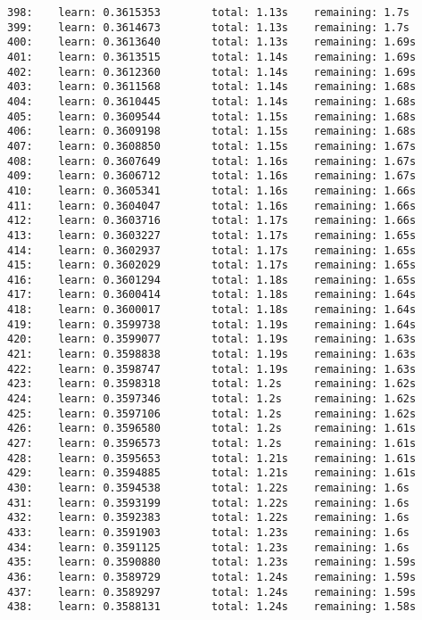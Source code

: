 \documentclass[11pt]{article}
\begin{document}
\begin{Verbatim}[commandchars=\\\{\}]
398:    learn: 0.3615353        total: 1.13s    remaining: 1.7s
399:    learn: 0.3614673        total: 1.13s    remaining: 1.7s
400:    learn: 0.3613640        total: 1.13s    remaining: 1.69s
401:    learn: 0.3613515        total: 1.14s    remaining: 1.69s
402:    learn: 0.3612360        total: 1.14s    remaining: 1.69s
403:    learn: 0.3611568        total: 1.14s    remaining: 1.68s
404:    learn: 0.3610445        total: 1.14s    remaining: 1.68s
405:    learn: 0.3609544        total: 1.15s    remaining: 1.68s
406:    learn: 0.3609198        total: 1.15s    remaining: 1.68s
407:    learn: 0.3608850        total: 1.15s    remaining: 1.67s
408:    learn: 0.3607649        total: 1.16s    remaining: 1.67s
409:    learn: 0.3606712        total: 1.16s    remaining: 1.67s
410:    learn: 0.3605341        total: 1.16s    remaining: 1.66s
411:    learn: 0.3604047        total: 1.16s    remaining: 1.66s
412:    learn: 0.3603716        total: 1.17s    remaining: 1.66s
413:    learn: 0.3603227        total: 1.17s    remaining: 1.65s
414:    learn: 0.3602937        total: 1.17s    remaining: 1.65s
415:    learn: 0.3602029        total: 1.17s    remaining: 1.65s
416:    learn: 0.3601294        total: 1.18s    remaining: 1.65s
417:    learn: 0.3600414        total: 1.18s    remaining: 1.64s
418:    learn: 0.3600017        total: 1.18s    remaining: 1.64s
419:    learn: 0.3599738        total: 1.19s    remaining: 1.64s
420:    learn: 0.3599077        total: 1.19s    remaining: 1.63s
421:    learn: 0.3598838        total: 1.19s    remaining: 1.63s
422:    learn: 0.3598747        total: 1.19s    remaining: 1.63s
423:    learn: 0.3598318        total: 1.2s     remaining: 1.62s
424:    learn: 0.3597346        total: 1.2s     remaining: 1.62s
425:    learn: 0.3597106        total: 1.2s     remaining: 1.62s
426:    learn: 0.3596580        total: 1.2s     remaining: 1.61s
427:    learn: 0.3596573        total: 1.2s     remaining: 1.61s
428:    learn: 0.3595653        total: 1.21s    remaining: 1.61s
429:    learn: 0.3594885        total: 1.21s    remaining: 1.61s
430:    learn: 0.3594538        total: 1.22s    remaining: 1.6s
431:    learn: 0.3593199        total: 1.22s    remaining: 1.6s
432:    learn: 0.3592383        total: 1.22s    remaining: 1.6s
433:    learn: 0.3591903        total: 1.23s    remaining: 1.6s
434:    learn: 0.3591125        total: 1.23s    remaining: 1.6s
435:    learn: 0.3590880        total: 1.23s    remaining: 1.59s
436:    learn: 0.3589729        total: 1.24s    remaining: 1.59s
437:    learn: 0.3589297        total: 1.24s    remaining: 1.59s
438:    learn: 0.3588131        total: 1.24s    remaining: 1.58s

\end{Verbatim}
\end{document}
